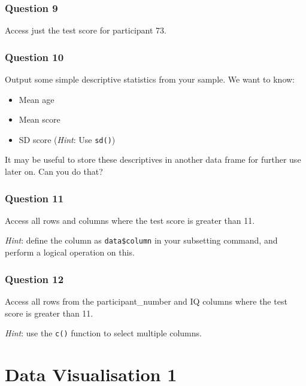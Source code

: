 \documentclass[
]{book}
\providecommand{\tightlist}{%
  \setlength{\itemsep}{0pt}\setlength{\parskip}{0pt}}
\begin{document}
\hypertarget{question-9}{%
\subsection{Question 9}\label{question-9}}

Access just the test score for participant 73.

\hypertarget{question-10}{%
\subsection{Question 10}\label{question-10}}

Output some simple descriptive statistics from your sample. We want to know:

\begin{itemize}
\tightlist
\item
  Mean age
\item
  Mean score
\item
  SD score (\emph{Hint}: Use \texttt{sd()})
\end{itemize}

It may be useful to store these descriptives in another data frame for further use later on. Can you do that?

\hypertarget{question-11}{%
\subsection{Question 11}\label{question-11}}

Access all rows and columns where the test score is greater than 11.

\emph{Hint}: define the column as \texttt{data\$column} in your subsetting command, and perform a logical operation on this.

\hypertarget{question-12}{%
\subsection{Question 12}\label{question-12}}

Access all rows from the participant\_number and IQ columns where the test score is greater than 11.

\emph{Hint}: use the \texttt{c()} function to select multiple columns.

\hypertarget{data-visualisation-1}{%
\chapter{Data Visualisation 1}\label{data-visualisation-1}}
\end{document}
